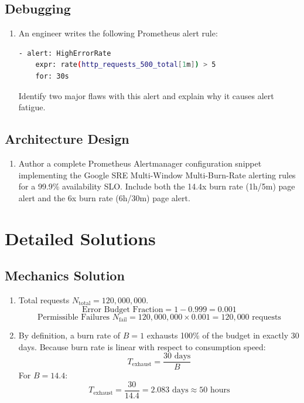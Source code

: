 \subsection*{Debugging}
\begin{enumerate}[leftmargin=18pt]
  \item An engineer writes the following Prometheus alert rule:
  \begin{lstlisting}[language=bash]
  - alert: HighErrorRate
    expr: rate(http_requests_500_total[1m]) > 5
    for: 30s
  \end{lstlisting}
  Identify two major flaws with this alert and explain why it causes alert fatigue.
\end{enumerate}

\subsection*{Architecture Design}
\begin{enumerate}[leftmargin=18pt]
  \item Author a complete Prometheus Alertmanager configuration snippet implementing the Google SRE Multi-Window Multi-Burn-Rate alerting rules for a 99.9\% availability SLO. Include both the 14.4x burn rate (1h/5m) page alert and the 6x burn rate (6h/30m) page alert.
\end{enumerate}

\section{Detailed Solutions}

\subsection*{Mechanics Solution}
\begin{enumerate}[leftmargin=18pt]
  \item Total requests $N_{\text{total}} = 120,000,000$.
  $$\text{Error Budget Fraction} = 1 - 0.999 = 0.001$$
  $$\text{Permissible Failures } N_{\text{fail}} = 120,000,000 \times 0.001 = 120,000 \text{ requests}$$
  
  \item By definition, a burn rate of $B = 1$ exhausts 100\% of the budget in exactly 30 days. Because burn rate is linear with respect to consumption speed:
  $$T_{\text{exhaust}} = \frac{30\text{ days}}{B}$$
  For $B = 14.4$:
  $$T_{\text{exhaust}} = \frac{30}{14.4} = 2.083\text{ days} \approx 50\text{ hours}$$
\end{enumerate}

